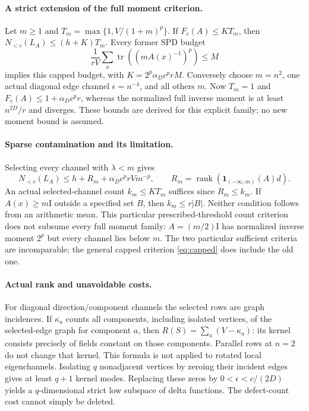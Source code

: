 \documentclass[11pt,a4paper]{article}
\newcommand{\tr}{\operatorname{tr}}
\newcommand{\rank}{\operatorname{rank}}
\newcommand{\id}{\mathrm I}
\newcommand{\Nlow}{N_{<c}}
\begin{document}
\paragraph{A strict extension of the full moment criterion.}
Let $m\geq1$ and $T_m=\max\{1,V/(1+m)^p\}$. If $F_c(A)\leq KT_m$,
then $\Nlow(L_A)\leq(h+K)T_m$. Every former SPD budget
\[
 \frac1{rV}\sum_x\tr((mA(x)^{-1})^p)\leq M
\]
implies this capped budget, with $K=2^p\alpha_Dc^prM$.
Conversely choose $m=n^2$, one actual diagonal edge channel
$\epsilon=n^{-4}$, and all others $m$. Now $T_m=1$ and
$F_c(A)\leq1+\alpha_Dc^pr$, whereas the normalized full inverse moment is
at least $n^{2D}/r$ and diverges. These bounds are derived for this explicit
family; no new moment bound is assumed.

\paragraph{Sparse contamination and its limitation.}
Selecting every channel with $\lambda<m$ gives
\[
 \Nlow(L_A)\leq h+R_m+\alpha_Dc^prVm^{-p},
 \qquad R_m=\rank(\boldsymbol1_{(-\infty,m)}(A)d).
\]
An actual selected-channel count $k_m\leq KT_m$ suffices since $R_m\leq k_m$.
If $A(x)\geq m\id$ outside a specified set $B$, then $k_m\leq r|B|$.
Neither condition follows from an arithmetic mean. This particular
prescribed-threshold count criterion does not subsume every full moment
family: $A=(m/2)\id$ has normalized inverse moment $2^p$ but every channel
lies below $m$. The two particular sufficient criteria are incomparable;
the general capped criterion \eqref{eq:capped} does include the old one.

\paragraph{Actual rank and unavoidable costs.}
For diagonal direction/component channels the selected rows are graph
incidences. If $\kappa_a$ counts all components, including isolated vertices,
of the selected-edge graph for component $a$, then
$R(S)=\sum_a(V-\kappa_a)$: its kernel consists precisely of fields constant
on those components. Parallel rows at $n=2$ do not change that kernel.
This formula is not applied to rotated local eigenchannels.
Isolating $q$ nonadjacent vertices by zeroing their incident edges gives
at least $q+1$ kernel modes. Replacing these zeros by
$0<\epsilon<c/(2D)$ yields a $q$-dimensional strict low subspace of delta
functions. The defect-count cost cannot simply be deleted.
\end{document}
